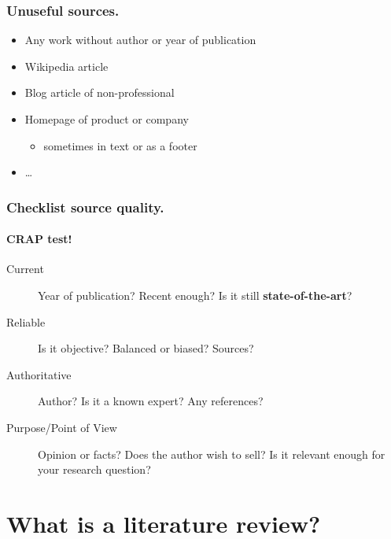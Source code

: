 \documentclass[aspectratio=169]{beamer}
\begin{document}
    \begin{frame}
        \frametitle{Unuseful sources.}
        
        \begin{itemize}
            \item Any work without author or year of publication
            \item Wikipedia article
            \item Blog article of non-professional 
            \item Homepage of product or company 
            \begin{itemize}
                \item sometimes in text or as a footer
            \end{itemize}
            \item \dots
        \end{itemize}
    \end{frame}
    
    \begin{frame}
        \frametitle{Checklist source quality.}
        \framesubtitle{CRAP test!}
        
        \begin{description}
            \item[Current] Year of publication? Recent enough? Is it still \textbf{state-of-the-art}?
            \item[Reliable] Is it objective? Balanced or biased? Sources?
            \item[Authoritative] Author? Is it a known expert? Any references?
            \item[Purpose/Point of View] Opinion or facts? Does the author wish to sell? Is it relevant enough for your research question?
        \end{description}
        
    \end{frame}
    
    
    
    \section{What is a literature review?}
    
\end{document}
